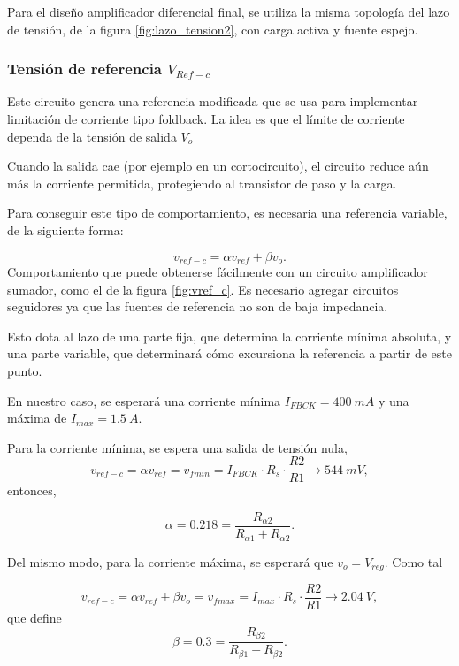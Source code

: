 \documentclass[]{article}
\begin{document}
Para el diseño amplificador diferencial final, se utiliza la misma topología del lazo de tensión, de la figura \ref{fig:lazo_tension2}, con carga activa y fuente espejo.
\FloatBarrier
\subsubsection{Tensión de referencia $V_{Ref-c}$}
\FloatBarrier
Este circuito genera una referencia modificada que se usa para implementar limitación de corriente tipo foldback. La idea es que el límite de corriente dependa de la tensión de salida $V_o$

Cuando la salida cae (por ejemplo en un cortocircuito), el circuito reduce aún más la corriente permitida, protegiendo al transistor de paso y la carga.

Para conseguir este tipo de comportamiento, es necesaria una referencia variable, de la siguiente forma:

\begin{equation}
	v_{ref-c} = \alpha v_{ref} + \beta v_o.
\end{equation}
Comportamiento que puede obtenerse fácilmente con un circuito amplificador sumador, como el de la figura \ref{fig:vref_c}. Es necesario agregar circuitos seguidores ya que las fuentes de referencia no son de baja impedancia.

Esto dota al lazo de una parte fija, que determina la corriente mínima absoluta, y una parte variable, que determinará cómo excursiona la referencia a partir de este punto.

En nuestro caso, se esperará una corriente mínima $I_{FBCK} = \SI{400}{mA}$ y una máxima de $I_{max} = \SI{1.5}{A}$.

Para la corriente mínima, se espera una salida de tensión nula,
$$v_{ref-c} = \alpha v_{ref} = v_{fmin} = I_{FBCK} \cdot R_s \cdot \frac{R2}{R1} \rightarrow \SI{544}{mV},$$
entonces, 

\begin{equation}
\alpha = 0.218 = \frac{R_{\alpha2}}{R_{\alpha1} + R_{\alpha2}}.
\end{equation}

Del mismo modo, para la corriente máxima, se esperará que $v_o = V_{reg}$. Como tal

$$v_{ref-c} = \alpha v_{ref} + \beta v_o = v_{fmax} = I_{max} \cdot R_s \cdot \frac{R2}{R1} \rightarrow \SI{2.04}{V},$$
que define
\begin{equation}
\beta = 0.3 = \frac{R_{\beta2}}{R_{\beta1} + R_{\beta2}}.
\end{equation}
\end{document}
